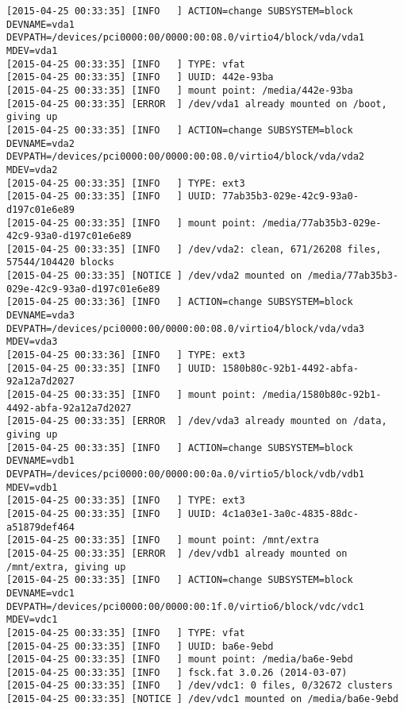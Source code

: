 \begin{tiny}
\begin{verbatim}
[2015-04-25 00:33:35] [INFO   ] ACTION=change SUBSYSTEM=block DEVNAME=vda1 DEVPATH=/devices/pci0000:00/0000:00:08.0/virtio4/block/vda/vda1 MDEV=vda1
[2015-04-25 00:33:35] [INFO   ] TYPE: vfat
[2015-04-25 00:33:35] [INFO   ] UUID: 442e-93ba
[2015-04-25 00:33:35] [INFO   ] mount point: /media/442e-93ba
[2015-04-25 00:33:35] [ERROR  ] /dev/vda1 already mounted on /boot, giving up
[2015-04-25 00:33:35] [INFO   ] ACTION=change SUBSYSTEM=block DEVNAME=vda2 DEVPATH=/devices/pci0000:00/0000:00:08.0/virtio4/block/vda/vda2 MDEV=vda2
[2015-04-25 00:33:35] [INFO   ] TYPE: ext3
[2015-04-25 00:33:35] [INFO   ] UUID: 77ab35b3-029e-42c9-93a0-d197c01e6e89
[2015-04-25 00:33:35] [INFO   ] mount point: /media/77ab35b3-029e-42c9-93a0-d197c01e6e89
[2015-04-25 00:33:35] [INFO   ] /dev/vda2: clean, 671/26208 files, 57544/104420 blocks
[2015-04-25 00:33:35] [NOTICE ] /dev/vda2 mounted on /media/77ab35b3-029e-42c9-93a0-d197c01e6e89
[2015-04-25 00:33:36] [INFO   ] ACTION=change SUBSYSTEM=block DEVNAME=vda3 DEVPATH=/devices/pci0000:00/0000:00:08.0/virtio4/block/vda/vda3 MDEV=vda3
[2015-04-25 00:33:36] [INFO   ] TYPE: ext3
[2015-04-25 00:33:35] [INFO   ] UUID: 1580b80c-92b1-4492-abfa-92a12a7d2027
[2015-04-25 00:33:35] [INFO   ] mount point: /media/1580b80c-92b1-4492-abfa-92a12a7d2027
[2015-04-25 00:33:35] [ERROR  ] /dev/vda3 already mounted on /data, giving up
[2015-04-25 00:33:35] [INFO   ] ACTION=change SUBSYSTEM=block DEVNAME=vdb1 DEVPATH=/devices/pci0000:00/0000:00:0a.0/virtio5/block/vdb/vdb1 MDEV=vdb1
[2015-04-25 00:33:35] [INFO   ] TYPE: ext3
[2015-04-25 00:33:35] [INFO   ] UUID: 4c1a03e1-3a0c-4835-88dc-a51879def464
[2015-04-25 00:33:35] [INFO   ] mount point: /mnt/extra
[2015-04-25 00:33:35] [ERROR  ] /dev/vdb1 already mounted on /mnt/extra, giving up
[2015-04-25 00:33:35] [INFO   ] ACTION=change SUBSYSTEM=block DEVNAME=vdc1 DEVPATH=/devices/pci0000:00/0000:00:1f.0/virtio6/block/vdc/vdc1 MDEV=vdc1
[2015-04-25 00:33:35] [INFO   ] TYPE: vfat
[2015-04-25 00:33:35] [INFO   ] UUID: ba6e-9ebd
[2015-04-25 00:33:35] [INFO   ] mount point: /media/ba6e-9ebd
[2015-04-25 00:33:35] [INFO   ] fsck.fat 3.0.26 (2014-03-07)
[2015-04-25 00:33:35] [INFO   ] /dev/vdc1: 0 files, 0/32672 clusters
[2015-04-25 00:33:35] [NOTICE ] /dev/vdc1 mounted on /media/ba6e-9ebd
\end{verbatim}
\end{tiny}

